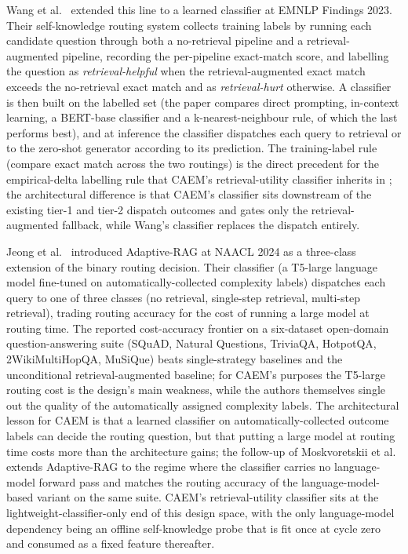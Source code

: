 Wang et al.~\cite{wang2023skr} extended this line to a learned classifier at EMNLP Findings 2023. Their self-knowledge routing system collects training labels by running each candidate question through both a no-retrieval pipeline and a retrieval-augmented pipeline, recording the per-pipeline exact-match score, and labelling the question as \emph{retrieval-helpful} when the retrieval-augmented exact match exceeds the no-retrieval exact match and as \emph{retrieval-hurt} otherwise. A classifier is then built on the labelled set (the paper compares direct prompting, in-context learning, a BERT-base classifier and a k-nearest-neighbour rule, of which the last performs best), and at inference the classifier dispatches each query to retrieval or to the zero-shot generator according to its prediction. The training-label rule (compare exact match across the two routings) is the direct precedent for the empirical-delta labelling rule that CAEM's retrieval-utility classifier inherits in ; the architectural difference is that CAEM's classifier sits downstream of the existing tier-1 and tier-2 dispatch outcomes and gates only the retrieval-augmented fallback, while Wang's classifier replaces the dispatch entirely.

Jeong et al.~\cite{jeong2024adaptive} introduced Adaptive-RAG at NAACL 2024 as a three-class extension of the binary routing decision. Their classifier (a T5-large language model fine-tuned on automatically-collected complexity labels) dispatches each query to one of three classes (no retrieval, single-step retrieval, multi-step retrieval), trading routing accuracy for the cost of running a large model at routing time. The reported cost-accuracy frontier on a six-dataset open-domain question-answering suite (SQuAD, Natural Questions, TriviaQA, HotpotQA, 2WikiMultiHopQA, MuSiQue) beats single-strategy baselines and the unconditional retrieval-augmented baseline; for CAEM's purposes the T5-large routing cost is the design's main weakness, while the authors themselves single out the quality of the automatically assigned complexity labels. The architectural lesson for CAEM is that a learned classifier on automatically-collected outcome labels can decide the routing question, but that putting a large model at routing time costs more than the architecture gains; the follow-up of Moskvoretskii et al.~\cite{moskvoretskii2025llm} extends Adaptive-RAG to the regime where the classifier carries no language-model forward pass and matches the routing accuracy of the language-model-based variant on the same suite. CAEM's retrieval-utility classifier sits at the lightweight-classifier-only end of this design space, with the only language-model dependency being an offline self-knowledge probe that is fit once at cycle zero and consumed as a fixed feature thereafter.

